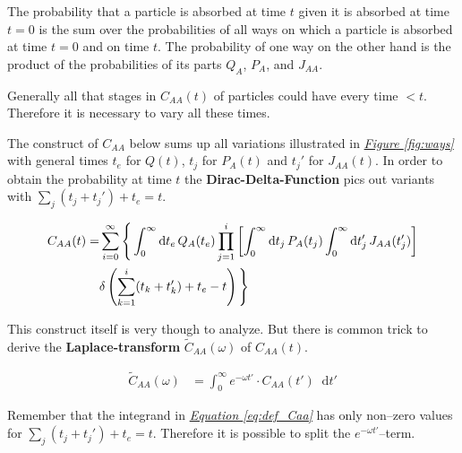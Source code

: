 \documentclass[a4paper, parskip=half]{scrartcl}
\newcommand{\effect}[1]{%
	\textbf{#1}%
}
\newcommand{\diff}{\mathop{}\!\mathrm{d}}
\newcommand{\myFigRef}[1]{\textit{\hyperref[#1]{Figure \ref*{#1}}}}
\newcommand{\myEqRef}[1]{\textit{\hyperref[eq:#1]{Equation \ref*{eq:#1}}}}
\newcommand{\myEqLabel}[1]{\label{eq:#1}}
\begin{document}
The probability that a particle is absorbed at time $t$ given it is absorbed at time $t=0$ is the sum over the probabilities of all ways on which a particle is absorbed at time $t=0$ and on time $t$. The probability of one way on the other hand is the product of the probabilities of its parts $Q_A$, $P_A$, and $J_{AA}$.

Generally all that stages in $C_{AA}(t)$ of particles could have every time $<t$. Therefore it is necessary to vary all these times. 

The construct of $C_{AA}$ below sums up all variations illustrated in \myFigRef{fig:ways} with general times $t_e$ for $Q(t)$, $t_j$ for $P_A(t)$ and $t_j'$ for $J_{AA}(t)$. In order to obtain the probability at time $t$ the \effect{Dirac-Delta-Function} pics out variants with $\sum_{j} (t_j+t_j') + t_e = t$.

\begin{align}
C_{AA}(t) = &\sum_{i=0}^\infty \Bigg\lbrace \int_0^\infty \diff t_e\, Q_A(t_e) \prod_{j=1}^i \left[ \int_0^\infty \diff t_j\, P_A(t_j) \int_0^\infty \diff t_j'\, J_{AA}(t_j')\right]\notag\\ 
&\delta \left(\sum_{k=1}^i(t_k+t_k') + t_e - t \right) \Bigg\rbrace \myEqLabel{def_Caa}
\end{align}

This construct itself is very though to analyze. But there is common trick to derive the \effect{Laplace-transform} $\widetilde{C}_{AA}(\omega)$ of $C_{AA}(t)$.

\begin{align}
\widetilde{C}_{AA}(\omega) &= \int_0^\infty e^{-\omega t'} \cdot C_{AA}(t') \diff t'
\end{align}

Remember that the integrand in \myEqRef{def_Caa} has only non--zero values for $\sum_{j} (t_j+t_j') + t_e = t$. Therefore it is possible to split the $e^{-\omega t'}$--term.
\end{document}
